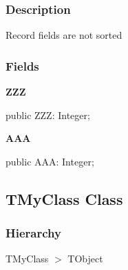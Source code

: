 \documentclass{report}
\newif\ifpdf
\begin{document}
\subsubsection*{\large{\textbf{Description}}\normalsize\hspace{1ex}\hfill}
Record fields are not sorted\subsubsection*{\large{\textbf{Fields}}\normalsize\hspace{1ex}\hfill}
\begin{list}{}{
\setlength{\itemindent}{0cm}
\setlength{\listparindent}{0cm}
\setlength{\leftmargin}{\evensidemargin}
\addtolength{\leftmargin}{\tmplength}
\settowidth{\labelsep}{X}
\addtolength{\leftmargin}{\labelsep}
\setlength{\labelwidth}{\tmplength}
}
\label{ok_no_sort.TMyRecord-ZZZ}
\item[\textbf{ZZZ}\hfill]
\ifpdf
\begin{flushleft}
\fi
\begin{ttfamily}
public ZZZ: Integer;\end{ttfamily}

\ifpdf
\end{flushleft}
\fi


\par  \label{ok_no_sort.TMyRecord-AAA}
\item[\textbf{AAA}\hfill]
\ifpdf
\begin{flushleft}
\fi
\begin{ttfamily}
public AAA: Integer;\end{ttfamily}

\ifpdf
\end{flushleft}
\fi


\par  \end{list}
\ifpdf
\subsection*{\large{\textbf{TMyClass Class}}\normalsize\hspace{1ex}\hrulefill}
\else
\subsection*{TMyClass Class}
\fi
\label{ok_no_sort.TMyClass}
\subsubsection*{\large{\textbf{Hierarchy}}\normalsize\hspace{1ex}\hfill}
TMyClass {$>$} TObject
\end{document}
